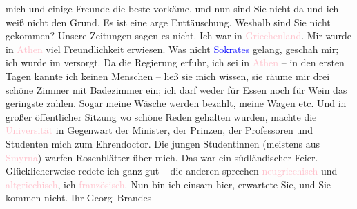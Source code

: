                mich und einige Freunde die beste vorkäme, und nun sind Sie nicht da und ich weiß
               nicht den Grund. Es ist eine arge Enttäuschung. Weshalb sind Sie nicht gekommen?
               Unsere Zeitungen sagen es nicht.\pend
           \pstart
           Ich war in \textcolor{pink}{Griechenland}{}\ledrightnote{\textcolor{pink}{Griechenland}}. Mir wurde in \textcolor{pink}{Athen}{}\ledrightnote{\textcolor{pink}{Athen}} viel Freundlichkeit erwiesen. Was nicht \textcolor{blue}{Sokrates}{}\ledrightnote{\textcolor{blue}{Sokrates}} gelang, geschah mir; ich wurde im \label{K_L02383_2v}\label{K_L02383_2h} versorgt. Da die Regierung erfuhr,
               ich sei in \textcolor{pink}{Athen}{}\ledrightnote{\textcolor{pink}{Athen}} – in den ersten Tagen kannte ich
               keinen Menschen – ließ sie mich wissen, sie räume mir drei schöne Zimmer mit
               Badezimmer ein; ich darf weder für Essen noch für Wein das geringste zahlen. Sogar
               meine Wäsche werden bezahlt, meine Wagen etc. Und in großer öffentlicher Sitzung wo
               schöne Reden gehalten wurden, machte die \textcolor{pink}{Universität}{}\ledrightnote{\textcolor{pink}{Nationale und Kapodistrias-Universität Athen}} in Gegenwart der Minister, der Prinzen, der Professoren und
               Studenten mich zum Ehrendoctor. Die jungen Studentinnen (meistens aus \textcolor{pink}{Smyrna}{}\ledrightnote{\textcolor{pink}{Izmir}}) warfen Rosenblätter über mich. Das war ein
               südländischer Feier. Glücklicherweise redete ich ganz gut – die anderen
               sprechen \textcolor{pink}{neugriechisch}{}\ledrightnote{\textcolor{pink}{Griechenland}} und \textcolor{pink}{altgriechisch}{}\ledrightnote{\textcolor{pink}{Griechenland}}, ich \textcolor{pink}{französisch}{}\ledrightnote{\textcolor{pink}{Frankreich}}.\pend
           \pstart
           Nun bin ich einsam hier, erwartete Sie, und Sie kommen nicht.\pend
           \pstart Ihr \spacefill\mbox{Georg Brandes}\pend{}\endnumbering{}  
      